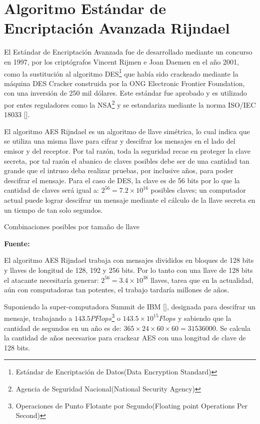 \documentclass[../main/main.tex]{subfiles}
\begin{document}
  \section{Algoritmo Estándar de Encriptación Avanzada Rijndael}

  El Estándar de Encriptación Avanzada fue de desarrollado mediante un concurso en 1997, por los criptógrafos Vincent Rijmen e Joan Daemen en el año 2001, como la sustitución al algoritmo DES\footnote{Estándar de Encriptación de Datos(Data Encryption Standard)} que había sido crackeado mediante la máquina DES Cracker construida por la ONG Electronic Frontier Foundation, con una inversión de 250 mil dólares. Este estándar fue aprobado y es utilizado por entes reguladores como la NSA\footnote{Agencia de Seguridad Nacional(National Security Agency)} y se estandariza mediante la norma ISO/IEC 18033 [\cite{standard:iso_18033}].

  El algoritmo AES Rijndael es un algoritmo de llave simétrica, lo cual indica que se utiliza una misma llave para cifrar y descifrar los mensajes en el lado del emisor y del receptor. Por tal razón, toda la seguridad recae en proteger la clave secreta, por tal razón el abanico de claves posibles debe ser de una cantidad tan grande que el intruso deba realizar pruebas, por inclusive años, para poder descifrar el mensaje. Para el caso de DES, la clave es de 56 bits por lo que la cantidad de claves será igual a: $2^{56} = 7.2 \times 10^{16}$ posibles claves; un computador actual puede lograr descifrar un mensaje mediante el cálculo de la llave secreta en un tiempo de tan solo segundos.

  \begin{table}[H]
    \centering
    \caption{Combinaciones posibles por tamaño de llave}
    
    \caption*{\textbf{Fuente:} \cite{web:secure_mobile_aes_encryption}}
  \end{table}

  El algoritmo AES Rijndael trabaja con mensajes divididos en bloques de 128 bits y llaves de longitud de 128, 192 y 256 bits. Por lo tanto con una llave de 128 bits el atacante necesitaría generar: $2^{56} = 3.4 \times 10^{38}$ llaves, tarea que en la actualidad, aún con computadoras tan potentes, el trabajo tardaría millones de años.

  Suponiendo la super-computadora Summit de IBM [\cite{web:supercomputadora_summit_ibm}], designada para descifrar un mensaje, trabajando a $143.5PFlops$\footnote{Operaciones de Punto Flotante por Segundo(Floating point Operations Per Second)} o $143.5 \times 10^{15} Flops$ y sabiendo que la cantidad de segundos en un año es de: $365 \times 24 \times 60 \times 60 = 31536000$. Se calcula la cantidad de años necesarios para crackear AES con una longitud de clave de 128 bits.
\end{document}
